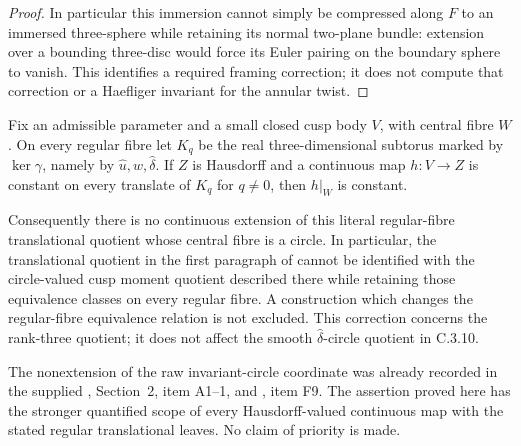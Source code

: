 \begin{proof}
In particular this immersion cannot simply be compressed along
\(F\) to an immersed three-sphere while retaining its normal
two-plane bundle: extension over a bounding three-disc would force
its Euler pairing on the boundary sphere to vanish. This identifies
a required framing correction; it does not compute that correction
or a Haefliger invariant for the annular twist.
\end{proof}
\begin{proposition}
Fix an admissible parameter and a small closed cusp body $V$, with
central fibre $W$. On every regular fibre let $K_q$ be the real
three-dimensional subtorus marked by $\ker\gamma$, namely by
$\widehat u,\widehat w,\widehat\delta$.
If $Z$ is Hausdorff and a continuous map $h:V\to Z$ is constant
on every translate of $K_q$ for $q\ne0$, then $h|_W$ is constant.

Consequently there is no continuous extension of this literal
regular-fibre translational quotient whose central fibre is a
circle. In particular, the translational quotient in the first
paragraph of \citet[Remark 8.3]{E26} cannot be identified with the
circle-valued cusp moment quotient described there while retaining
those equivalence classes on every regular fibre. A construction
which changes the regular-fibre equivalence relation is not excluded.
This correction concerns the rank-three quotient; it does not affect
the smooth $\widehat\delta$-circle quotient in C.3.10.
\end{proposition}
The nonextension of the raw invariant-circle coordinate was already
recorded in the supplied ,
Section~2, item A1--1, and
, item F9.
The assertion proved here has the stronger quantified scope of every
Hausdorff-valued continuous map with the stated regular translational
leaves. No claim of priority is made.
